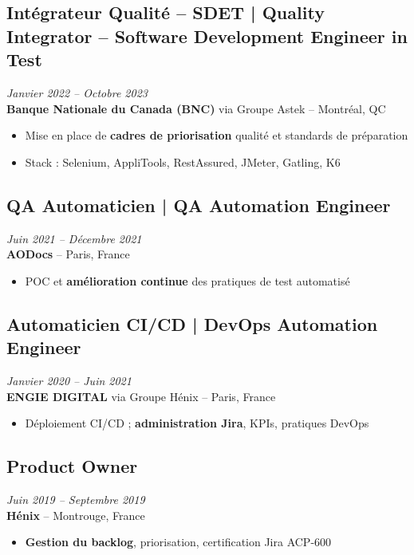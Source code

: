 \documentclass[11pt,a4paper]{article}
\begin{document}
\subsection*{Intégrateur Qualité -- SDET | Quality Integrator -- Software Development Engineer in Test} \hfill \textit{Janvier 2022 -- Octobre 2023}\\
\textbf{Banque Nationale du Canada (BNC)} via Groupe Astek -- Montréal, QC\\
\begin{itemize}
    \item Mise en place de \textbf{cadres de priorisation} qualité et standards de préparation
    \item Stack : Selenium, AppliTools, RestAssured, JMeter, Gatling, K6
\end{itemize}

\subsection*{QA Automaticien | QA Automation Engineer} \hfill \textit{Juin 2021 -- Décembre 2021}\\
\textbf{AODocs} -- Paris, France\\
\begin{itemize}
    \item POC et \textbf{amélioration continue} des pratiques de test automatisé
\end{itemize}

\subsection*{Automaticien CI/CD | DevOps Automation Engineer} \hfill \textit{Janvier 2020 -- Juin 2021}\\
\textbf{ENGIE DIGITAL} via Groupe Hénix -- Paris, France\\
\begin{itemize}
    \item Déploiement CI/CD ; \textbf{administration Jira}, KPIs, pratiques DevOps
\end{itemize}

\subsection*{Product Owner} \hfill \textit{Juin 2019 -- Septembre 2019}\\
\textbf{Hénix} -- Montrouge, France\\
\begin{itemize}
    \item \textbf{Gestion du backlog}, priorisation, certification Jira ACP-600
\end{itemize}
\end{document}
